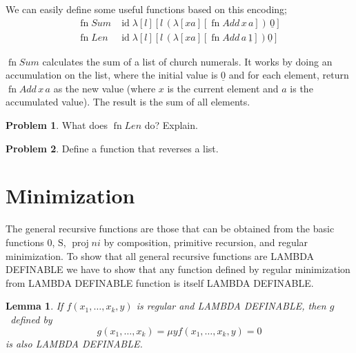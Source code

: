 \documentclass[10pt,a4paper]{article}
\newcommand*{\olup}[1]{\MakeUppercase{#1}}
\theoremstyle{plain}
\newtheorem{lem}[thm]{Lemma}
\theoremstyle{definition}
\newtheorem{prob}{Problem}[section]
\theoremstyle{remark}
\newcommand*{\olfileid}[3]{}
\newcommand*{\olsection}[1]{\section*{#1}}
\newcommand*{\ollabel}[1]{\label{#1}}
\providecommand{\num}[1]{\underline{#1}}
\providecommand{\Zero}{\ensuremath{0}}
\providecommand{\Succ}{\ensuremath{\mathrm{S}}}
\providecommand{\lambd}{\ensuremath{\lambda}}
\providecommand{\Proj}{\operatorname{proj}}
\providecommand{\umin}{\mu}
\providecommand{\ident}{\operatorname{id}}
\providecommand{\fn}{\operatorname{fn}}
\begin{document}
We can easily define some useful functions based on this encoding; 
\begin{align*}
  \fn{Sum} & \ident
  \lambd[l][l \, (\lambd[xa][\fn{Add} \, x \, a])\,  \num{0}]\\
  \fn{Len} & \ident
  \lambd[l][l \, (\lambd[xa][\fn{Add} \, a \, \num{1}]) \num{0}]
\end{align*}

$\fn{Sum}$ calculates the sum of a list of church numerals. It works
by doing an accumulation on the list, where the initial value is
$\num{0}$ and for each element, return $\fn{Add} \, x\, a$ as the new
value (where $x$ is the current element and $a$ is the accumulated
value). The result is the sum of all elements.

\begin{prob}
  What does $\fn{Len}$ do? Explain.
\end{prob}

\begin{prob}
  Define a function that reverses a list.
\end{prob}





\olfileid{lam}{ldf}{min}
\olsection{Minimization}

The general recursive functions are those that can be obtained from
the basic functions $\Zero$, $\Succ$, $\Proj{n}{i}$ by composition,
primitive recursion, and regular minimization. To show that all
general recursive functions are \olup{lambda definable} we have to show
that any function defined by regular minimization from \olup{lambda
  definable} function is itself \olup{lambda definable}.

\begin{lem}
  \ollabel{lem:min} If $f(x_1, \dots, x_k, y)$ is regular and
  \olup{lambda definable}, then $g$~defined by
  \[
  g(x_1, \dots, x_k) = \umin{y}{f(x_1,\dots,x_k, y) = 0}
  \]
  is also \olup{lambda definable}.
\end{lem}
\end{document}

